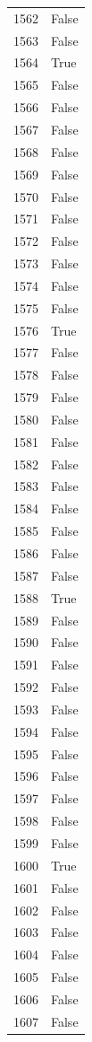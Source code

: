 \documentclass[
  letterpaper,
  DIV=11,
  numbers=noendperiod]{scrreprt}
\begin{document}
\begin{tabular}{ll}
1562 &  False \\
1563 &  False \\
1564 &   True \\
1565 &  False \\
1566 &  False \\
1567 &  False \\
1568 &  False \\
1569 &  False \\
1570 &  False \\
1571 &  False \\
1572 &  False \\
1573 &  False \\
1574 &  False \\
1575 &  False \\
1576 &   True \\
1577 &  False \\
1578 &  False \\
1579 &  False \\
1580 &  False \\
1581 &  False \\
1582 &  False \\
1583 &  False \\
1584 &  False \\
1585 &  False \\
1586 &  False \\
1587 &  False \\
1588 &   True \\
1589 &  False \\
1590 &  False \\
1591 &  False \\
1592 &  False \\
1593 &  False \\
1594 &  False \\
1595 &  False \\
1596 &  False \\
1597 &  False \\
1598 &  False \\
1599 &  False \\
1600 &   True \\
1601 &  False \\
1602 &  False \\
1603 &  False \\
1604 &  False \\
1605 &  False \\
1606 &  False \\
1607 &  False \\

\end{tabular}
\end{document}

